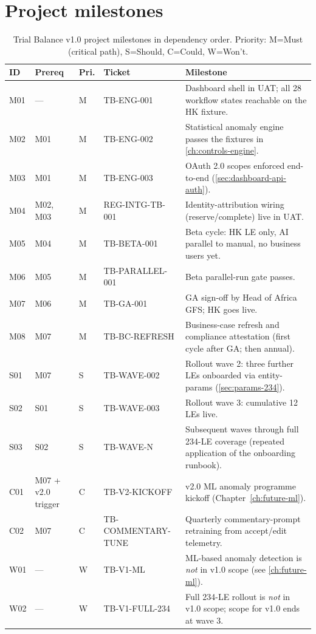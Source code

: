 \documentclass[11pt,a4paper,twoside]{report}
\begin{document}
\section{Project milestones}\label{sec:tb-milestones}

\begin{table}[htbp]
\centering
\caption{Trial Balance v1.0 project milestones in dependency order.
Priority: M=Must (critical path), S=Should, C=Could, W=Won't.}
\label{tab:tb-milestones}
\footnotesize
\begin{tabularx}{\linewidth}{@{}l l l l X@{}}
\toprule
\textbf{ID} & \textbf{Prereq} & \textbf{Pri.} & \textbf{Ticket} & \textbf{Milestone} \\ \midrule
M01 & ---       & M & TB-ENG-001         & Dashboard shell in UAT; all 28 workflow states reachable on the HK fixture. \\
M02 & M01       & M & TB-ENG-002         & Statistical anomaly engine passes the fixtures in \cref{ch:controls-engine}. \\
M03 & M01       & M & TB-ENG-003         & OAuth 2.0 scopes enforced end-to-end (\cref{sec:dashboard-api-auth}). \\
M04 & M02, M03  & M & REG-INTG-TB-001    & Identity-attribution wiring (reserve/complete) live in UAT. \\
M05 & M04       & M & TB-BETA-001        & Beta cycle: HK LE only, AI parallel to manual, no business users yet. \\
M06 & M05       & M & TB-PARALLEL-001    & Beta parallel-run gate passes. \\
M07 & M06       & M & TB-GA-001          & GA sign-off by Head of Africa GFS; HK goes live. \\
M08 & M07       & M & TB-BC-REFRESH      & Business-case refresh and compliance attestation (first cycle after GA; then annual). \\
S01 & M07       & S & TB-WAVE-002        & Rollout wave 2: three further LEs onboarded via entity-params (\cref{sec:params-234}). \\
S02 & S01       & S & TB-WAVE-003        & Rollout wave 3: cumulative 12 LEs live. \\
S03 & S02       & S & TB-WAVE-N          & Subsequent waves through full 234-LE coverage (repeated application of the onboarding runbook). \\
C01 & M07 + v2.0 trigger & C & TB-V2-KICKOFF & v2.0 ML anomaly programme kickoff (Chapter~\ref{ch:future-ml}). \\
C02 & M07       & C & TB-COMMENTARY-TUNE & Quarterly commentary-prompt retraining from accept/edit telemetry. \\
W01 & ---       & W & TB-V1-ML           & ML-based anomaly detection is \emph{not} in v1.0 scope (see \cref{ch:future-ml}). \\
W02 & ---       & W & TB-V1-FULL-234     & Full 234-LE rollout is \emph{not} in v1.0 scope; scope for v1.0 ends at wave 3. \\
\bottomrule
\end{tabularx}
\end{table}
\end{document}

